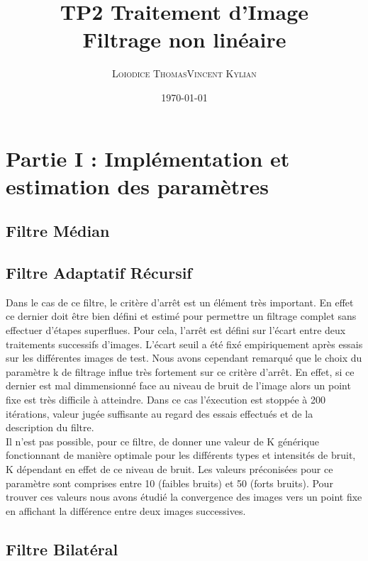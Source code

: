 \documentclass[a4,12pt]{article}
\title{\textbf{TP2 Traitement d'Image\\Filtrage non linéaire}}
\author{
\begin{tabular}{cc}
	\textsc{Loiodice Thomas} & \textsc{Vincent Kylian} \\
\end{tabular}}
\date{\small \today}
\begin{document}
\maketitle



\section{Partie I : Implémentation et estimation des paramètres}
\subsection{Filtre Médian}

\subsection{Filtre Adaptatif Récursif}
Dans le cas de ce filtre, le critère d'arrêt est un élément très important. En effet ce dernier doit être bien défini et estimé pour permettre un filtrage complet sans effectuer d'étapes superflues. Pour cela, l'arrêt est défini sur l'écart entre deux traitements successifs d'images. L'écart seuil a été fixé empiriquement après essais sur les différentes images de test. Nous avons cependant remarqué que le choix du paramètre k de filtrage influe très fortement sur ce critère d'arrêt. En effet, si ce dernier est mal dimmensionné face au niveau de bruit de l'image alors un point fixe est très difficile à atteindre. Dans ce cas l'éxecution est stoppée à 200 itérations, valeur jugée suffisante au regard des essais effectués et de la description du filtre.\\

Il n'est pas possible, pour ce filtre, de donner une valeur de K générique fonctionnant de manière optimale pour les différents types et intensités de bruit, K dépendant en effet de ce niveau de bruit. Les valeurs préconisées pour ce paramètre sont comprises entre  10 (faibles bruits) et 50 (forts bruits). Pour trouver ces valeurs nous avons étudié la convergence des images vers un point fixe en affichant la différence entre deux images successives.

\subsection{Filtre Bilatéral}
\end{document}
